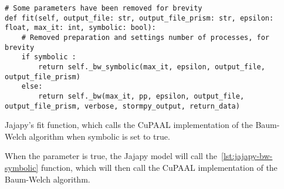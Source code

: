 \begin{listing}[htb!]
    \begin{verbatim}
# Some parameters have been removed for brevity
def fit(self, output_file: str, output_file_prism: str, epsilon: float, max_it: int, symbolic: bool):
    # Removed preparation and settings number of processes, for brevity
    if symbolic :
        return self._bw_symbolic(max_it, epsilon, output_file, output_file_prism)
    else:
        return self._bw(max_it, pp, epsilon, output_file, output_file_prism, verbose, stormpy_output, return_data)
      \end{verbatim}
    \caption{Jajapy's fit function, which calls the CuPAAL implementation of the Baum-Welch algorithm when symbolic is set to true.}
    \label{lst:jajapy-fit-cupaal}
\end{listing}

When the parameter is true, the Jajapy model will call the~\autoref{lst:jajapy-bw-symbolic} function, which will then call the CuPAAL implementation of the Baum-Welch algorithm.




